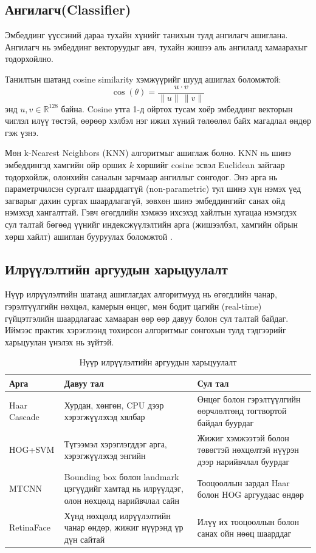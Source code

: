 \subsection{Ангилагч(Classifier)}
Эмбеддинг үүссэний дараа тухайн хүнийг танихын тулд ангилагч ашиглана. Ангилагч нь эмбеддинг векторуудыг авч, тухайн жишээ аль ангилалд хамаарахыг тодорхойлно.

Танилтын шатанд cosine similarity хэмжүүрийг шууд ашиглах боломжтой:
\[
\cos(\theta)=\frac{u\cdot v}{\lVert u\rVert\,\lVert v\rVert}
\]
энд $u,v \in \mathbb{R}^{128}$ байна. Cosine утга 1-д ойртох тусам хоёр эмбеддинг векторын чиглэл илүү төстэй, өөрөөр хэлбэл нэг ижил хүний төлөөлөл байх магадлал өндөр гэж үзнэ.

Мөн k-Nearest Neighbors (KNN) алгоритмыг ашиглаж болно. KNN нь шинэ эмбеддингэд хамгийн ойр орших $k$ хөршийг cosine эсвэл Euclidean зайгаар тодорхойлж, олонхийн саналын зарчмаар ангиллыг сонгодог. Энэ арга нь параметрчилсэн сургалт шаарддаггүй (non-parametric) тул шинэ хүн нэмэх үед загварыг дахин сургах шаардлагагүй, зөвхөн шинэ эмбеддингийг санах ойд нэмэхэд хангалттай. 
Гэвч өгөгдлийн хэмжээ ихсэхэд хайлтын хугацаа нэмэгдэх сул талтай бөгөөд үүнийг индексжүүлэлтийн арга (жишээлбэл, хамгийн ойрын хөрш хайлт) ашиглан бууруулах боломжтой \cite{chen2019face}.

\subsection{Илрүүлэлтийн аргуудын харьцуулалт}
Нүүр илрүүлэлтийн шатанд ашиглагдах алгоритмууд нь өгөгдлийн чанар, гэрэлтүүлгийн нөхцөл, камерын өнцөг, мөн бодит цагийн (real-time) гүйцэтгэлийн шаардлагаас хамааран өөр өөр давуу болон сул талтай байдаг. Иймээс практик хэрэглээнд тохирсон алгоритмыг сонгохын тулд тэдгээрийг харьцуулан үнэлэх нь зүйтэй.

\begin{table}[H]
\centering
\caption{Нүүр илрүүлэлтийн аргуудын харьцуулалт}
\begin{tabularx}{\textwidth}{|l|X|X|}
\hline
\textbf{Арга} & \textbf{Давуу тал} & \textbf{Сул тал} \\
\hline
Haar Cascade & Хурдан, хөнгөн, CPU дээр хэрэгжүүлэхэд хялбар & Өнцөг болон гэрэлтүүлгийн өөрчлөлтөнд тогтвортой байдал буурдаг \\
\hline
HOG+SVM & Түгээмэл хэрэглэгддэг арга, хэрэгжүүлэхэд энгийн & Жижиг хэмжээтэй болон төвөгтэй нөхцөлтэй нүүрэн дээр нарийвчлал буурдаг \\
\hline
MTCNN & Bounding box болон landmark цэгүүдийг хамтад нь илрүүлдэг, олон нөхцөлд нарийвчлал сайн & Тооцооллын зардал Haar болон HOG аргуудаас өндөр \\
\hline
RetinaFace & Хүнд нөхцөлд илрүүлэлтийн чанар өндөр, жижиг нүүрэнд үр дүн сайтай & Илүү их тооцооллын болон санах ойн нөөц шаарддаг \\
\hline
\end{tabularx}
\end{table}

